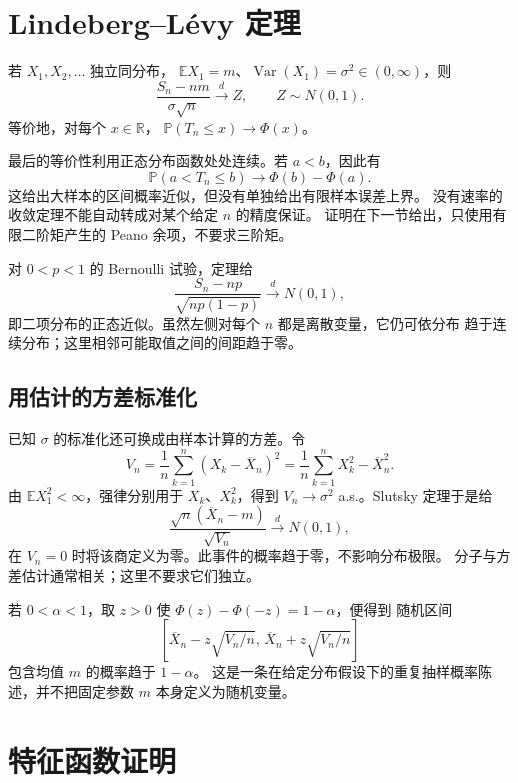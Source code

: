 \section{Lindeberg--Lévy 定理}
\label{sec:iid-central-limit-statement}

\begin{theorem}[独立同分布中心极限定理]
\label{thm:iid-central-limit}
若 $X_1,X_2,\ldots$ 独立同分布，
$\mathbb EX_1=m$、$\operatorname{Var}(X_1)=\sigma^2\in(0,\infty)$，则
\[
 \frac{S_n-nm}{\sigma\sqrt n}\xrightarrow d Z,
 \qquad Z\sim N(0,1).
\]
等价地，对每个 $x\in\mathbb R$，
$\mathbb P(T_n\le x)\to\Phi(x)$。
\end{theorem}

最后的等价性利用正态分布函数处处连续。若 $a<b$，因此有
\[
 \mathbb P(a<T_n\le b)\longrightarrow\Phi(b)-\Phi(a).
\]
这给出大样本的区间概率近似，但没有单独给出有限样本误差上界。
没有速率的收敛定理不能自动转成对某个给定 $n$ 的精度保证。
证明在下一节给出，只使用有限二阶矩产生的 Peano 余项，不要求三阶矩。

对 $0<p<1$ 的 Bernoulli 试验，定理给
\[
 \frac{S_n-np}{\sqrt{np(1-p)}}\xrightarrow d N(0,1),
\]
即二项分布的正态近似。虽然左侧对每个 $n$ 都是离散变量，它仍可依分布
趋于连续分布；这里相邻可能取值之间的间距趋于零。

\subsection{用估计的方差标准化}

已知 $\sigma$ 的标准化还可换成由样本计算的方差。令
\[
 V_n=\frac1n\sum_{k=1}^n(X_k-\overline X_n)^2
     =\frac1n\sum_{k=1}^nX_k^2-\overline X_n^2.
\]
由 $\mathbb E X_1^2<\infty$，强律分别用于 $X_k$、$X_k^2$，得到
$V_n\to\sigma^2$ a.s.。Slutsky 定理于是给
\begin{equation}
\label{eq:studentized-central-limit}
 \frac{\sqrt n(\overline X_n-m)}{\sqrt{V_n}}\xrightarrow dN(0,1),
\end{equation}
在 $V_n=0$ 时将该商定义为零。此事件的概率趋于零，不影响分布极限。
分子与方差估计通常相关；这里不要求它们独立。

若 $0<\alpha<1$，取 $z>0$ 使 $\Phi(z)-\Phi(-z)=1-\alpha$，便得到
随机区间
\[
 \left[\overline X_n-z\sqrt{V_n/n},\,
       \overline X_n+z\sqrt{V_n/n}\right]
\]
包含均值 $m$ 的概率趋于 $1-\alpha$。
这是一条在给定分布假设下的重复抽样概率陈述，并不把固定参数 $m$
本身定义为随机变量。

\section{特征函数证明}
\label{sec:characteristic-proof-clt}

